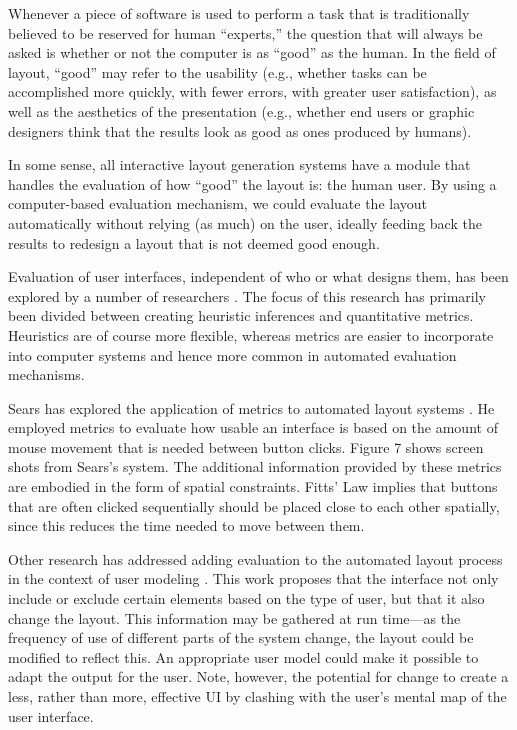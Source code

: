     Whenever a piece of software is used to perform a task that is
    traditionally believed to be reserved for human “experts,” the question
    that will always be asked is whether or not the computer is as “good” as
    the human. In the field of layout, “good” may refer to the usability (e.g.,
    whether tasks can be accomplished more quickly, with fewer errors, with
    greater user satisfaction), as well as the aesthetics of the presentation
    (e.g., whether end users or graphic designers think that the results look
    as good as ones produced by humans).

    In some sense, all interactive layout generation systems have a module that
    handles the evaluation of how “good” the layout is: the human user. By
    using a computer-based evaluation mechanism, we could evaluate the layout
    automatically without relying (as much) on the user, ideally feeding back
    the results to redesign a layout that is not deemed good enough.

    Evaluation of user interfaces, independent of who or what designs them, has
    been explored by a number of researchers
    \citep{tullis-1,sears-1,sears-3,comver-1,jeffries-1}. The focus of this
    research has primarily been divided between creating heuristic inferences
    and quantitative metrics. Heuristics are of course more flexible, whereas
    metrics are easier to incorporate into computer systems and hence more
    common in automated evaluation mechanisms.

    Sears has explored the application of metrics to automated layout systems
    \citep{sears-2}. He employed metrics to evaluate how usable an interface is
    based on the amount of mouse movement that is needed between button clicks.
    Figure 7 shows screen shots from Sears’s system. The additional information
    provided by these metrics are embodied in the form of spatial constraints.
    Fitts’ Law \citep{mackenzie-1} implies that buttons that are often clicked
    sequentially should be placed close to each other spatially, since this
    reduces the time needed to move between them.

    Other research has addressed adding evaluation to the automated layout
    process in the context of user modeling \citep{schlungbaum-1}. This work
    proposes that the interface not only include or exclude certain elements
    based on the type of user, but that it also change the layout. This
    information may be gathered at run time—as the frequency of use of
    different parts of the system change, the layout could be modified to
    reflect this. An appropriate user model could make it possible to adapt the
    output for the user. Note, however, the potential for change to create a
    less, rather than more, effective UI by clashing with the user’s mental map
    of the user interface.

